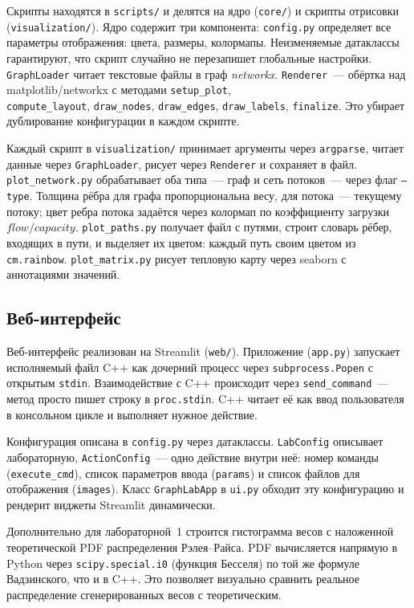 Скрипты находятся в \texttt{scripts/} и делятся на ядро (\texttt{core/})
и скрипты отрисовки (\texttt{visualization/}). Ядро содержит три компонента: \texttt{config.py} определяет все параметры отображения: цвета, размеры, колормапы. Неизменяемые
датаклассы гарантируют, что скрипт случайно не перезапишет глобальные
настройки. \texttt{GraphLoader} читает текстовые файлы в граф \textit{networkx}. \texttt{Renderer}~--- обёртка над
matplotlib/networkx с методами \texttt{setup\_plot}, \\\texttt{compute\_layout},
\texttt{draw\_nodes}, \texttt{draw\_edges}, \texttt{draw\_labels},
\texttt{finalize}. Это убирает дублирование конфигурации в каждом скрипте.

Каждый скрипт в \texttt{visualization/} принимает аргументы через
\texttt{argparse}, читает данные через \texttt{GraphLoader}, рисует через
\texttt{Renderer} и сохраняет в файл. \texttt{plot\_network.py}
обрабатывает оба типа~--- граф и сеть потоков~--- через флаг \texttt{--type}.
Толщина рёбра для графа пропорциональна весу, для потока~--- текущему потоку;
цвет ребра потока задаётся через колормап по коэффициенту загрузки
$flow/capacity$. \texttt{plot\_paths.py} получает файл с путями,
строит словарь рёбер, входящих в пути, и выделяет их цветом: каждый путь
своим цветом из \texttt{cm.rainbow}. \texttt{plot\_matrix.py} рисует
тепловую карту через seaborn с аннотациями значений.

\subsection{Веб-интерфейс}

Веб-интерфейс реализован на Streamlit (\texttt{web/}). Приложение
(\texttt{app.py}) запускает исполняемый файл C++ как дочерний процесс
через \texttt{subprocess.Popen} с открытым \texttt{stdin}. Взаимодействие
с C++ происходит через \texttt{send\_command}~--- метод просто пишет
строку в \texttt{proc.stdin}. C++ читает её как ввод пользователя в
консольном цикле и выполняет нужное действие.

Конфигурация описана в \texttt{config.py} через датаклассы.
\texttt{LabConfig} описывает лабораторную, \texttt{ActionConfig}~--- одно
действие внутри неё: номер команды (\texttt{execute\_cmd}), список
параметров ввода (\texttt{params}) и список файлов для отображения
(\texttt{images}). Класс \texttt{GraphLabApp} в \texttt{ui.py} обходит
эту конфигурацию и рендерит виджеты Streamlit динамически.

Дополнительно для лабораторной~1 строится гистограмма весов с наложенной
теоретической PDF распределения Рэлея--Райса. PDF вычисляется напрямую в
Python через \texttt{scipy.special.i0} (функция Бесселя) по той же формуле
Вадзинского, что и в C++. Это позволяет визуально сравнить реальное
распределение сгенерированных весов с теоретическим.
